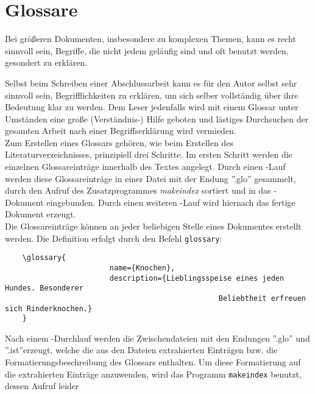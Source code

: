 %
%

\section{Glossare}
\label{sec:glossar}

Bei größeren Dokumenten, insbesondere zu komplexen Themen, kann es recht
sinnvoll sein, Begriffe, die nicht jedem geläufig sind und oft benutzt
werden, gesondert zu erklären.

Selbst beim Schreiben einer Abschlussarbeit kann es für den Autor selbst
sehr sinnvoll sein, Begrifflichkeiten zu erklären, um sich selber vollständig
über ihre Bedeutung klar zu werden. Dem Leser jedenfalls wird mit einem Glossar
unter Umständen eine große (Verständnis-) Hilfe geboten und lästiges
Durchsuchen der gesamten Arbeit nach einer Begriffserklärung wird vermieden.
\vspace{1em}
\\
Zum Erstellen eines Glossars gehören, wie beim Erstellen des Literaturverzeichnisses,
 prinzipiell drei Schritte.
Im ersten Schritt werden die einzelnen Glossareinträge innerhalb des Textes
angelegt. Durch einen \DMLLaTeX-Lauf werden diese Glossareinträge in
einer Datei mit der Endung ''.glo'' gesammelt, durch den Aufruf des
Zusatzprogrammes \emph{makeindex} sortiert und in das \DMLLaTeX-Dokument
eingebunden. Durch einen weiteren \DMLLaTeX-Lauf wird hiernach das fertige
Dokument erzeugt.
\vspace{1em}
\\
Die Glossareinträge können an jeder beliebigen Stelle eines Dokumentes erstellt werden.
Die Definition erfolgt durch den Befehl \texttt{glossary}:
\begin{verbatim}
	\glossary{
						name={Knochen},
						description={Lieblingsspeise eines jeden Hundes. Besonderer
												 Beliebtheit erfreuen sich Rinderknochen.}
	}
\end{verbatim}
Nach einem  \DMLLaTeX-Durchlauf  werden die Zwischendateien mit den Endungen ''.glo'' und
''.ist''erzeugt, welche die aus den Dateien extrahierten Einträgen bzw. die
Formatierungsbeschreibung des Glossars enthalten. Um diese Formatierung auf die extrahierten
Einträge anzuwenden, wird das Programm \texttt{makeindex} benutzt, dessen Aufruf leider
